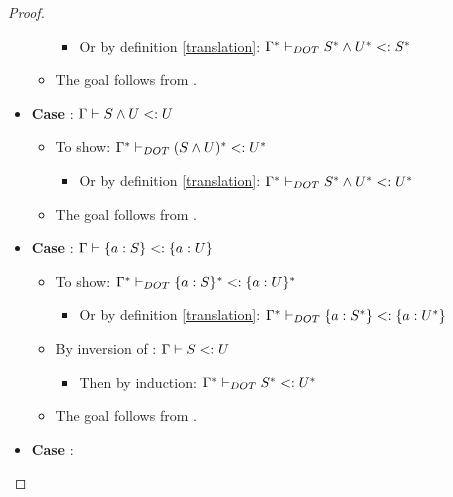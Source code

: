 \begin{proof}
\begin{itemize}
\begin{itemize}
            \begin{itemize}
                \item Or by definition \ref{translation}: $\Gamma^{*} \vdash_{DOT} S^{*} \wedge U^{*} <: S^{*}$
            \end{itemize}
            \item The goal follows from .
        \end{itemize}
        \item \textbf{Case} : $\Gamma \vdash S \wedge U <: U$
        \begin{itemize}
            \item To show:
                $\Gamma^{*} \vdash_{DOT} (S \wedge U)^{*} <: U^{*}$
            \begin{itemize}
                \item Or by definition \ref{translation}: $\Gamma^{*} \vdash_{DOT} S^{*} \wedge U^{*} <: U^{*}$
            \end{itemize}
            \item The goal follows from .
        \end{itemize}
        \item \textbf{Case} :
            $\Gamma \vdash \{a : S\} <: \{a : U\}$
        \begin{itemize}
            \item To show:
                $\Gamma^{*} \vdash_{DOT} \{a : S\}^{*} <: \{a : U\}^{*}$
            \begin{itemize}
                \item Or by definition \ref{translation}:
                    $\Gamma^{*} \vdash_{DOT} \{a : S^{*}\} <: \{a : U^{*}\}$
            \end{itemize}
            \item By inversion of : $\Gamma \vdash S <: U$
            \begin{itemize}
                \item Then by induction:
                    $\Gamma^{*} \vdash_{DOT} S^{*} <: U^{*}$
            \end{itemize}
            \item The goal follows from .
        \end{itemize}
        \item \textbf{Case} :

\end{itemize}
\end{proof}
